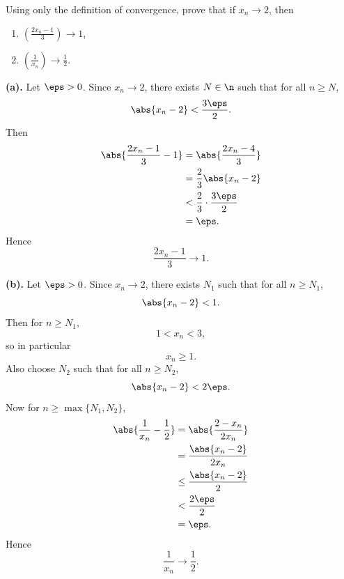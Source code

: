 \begin{problem}{
    Using only the definition of convergence, prove that if $x_n\to2$, then
    \begin{enumerate}[label={(\alph*)}]
\item \(\left(\frac{2x_n-1}{3}\right)\to1\),
\item \(\left(\frac{1}{x_n}\right)\to\frac12\).
    \end{enumerate}
}
    \textbf{(a).}
    Let $\eps>0$.
    Since $x_n\to2$, there exists $N\in\n$ such that for all $n\geq N$,
    \[
        \abs{x_n-2}<\frac{3\eps}{2}.
    \]
    Then
    \begin{align*}
        \abs{\frac{2x_n-1}{3}-1}
        &=\abs{\frac{2x_n-4}{3}}\\
        &=\frac23\abs{x_n-2}\\
        &<\frac23\cdot\frac{3\eps}{2}\\
        &=\eps.
    \end{align*}
    Hence
    \[
        \frac{2x_n-1}{3}\to1.
    \]

    \textbf{(b).}
    Let $\eps>0$.
    Since $x_n\to2$, there exists $N_1$ such that for all $n\geq N_1$,
    \[
        \abs{x_n-2}<1.
    \]
    Then for $n\geq N_1$,
    \[
        1<x_n<3,
    \]
    so in particular
    \[
        x_n\geq1.
    \]
    Also choose $N_2$ such that for all $n\geq N_2$,
    \[
        \abs{x_n-2}<2\eps.
    \]
    Now for $n\geq\max\{N_1,N_2\}$,
    \begin{align*}
        \abs{\frac1{x_n}-\frac12}
        &=\abs{\frac{2-x_n}{2x_n}}\\
        &=\frac{\abs{x_n-2}}{2x_n}\\
        &\leq \frac{\abs{x_n-2}}{2}\\
        &<\frac{2\eps}{2}\\
        &=\eps.
    \end{align*}
    Hence
    \[
        \frac1{x_n}\to\frac12.
    \]
\end{problem}

